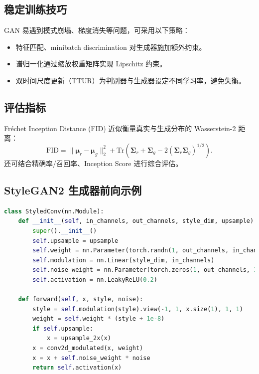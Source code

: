 \documentclass[UTF8,zihao=-4]{ctexart}
\begin{document}
\subsection{稳定训练技巧}
GAN 易遇到模式崩塌、梯度消失等问题，可采用以下策略：
\begin{itemize}
  \item 特征匹配、minibatch discrimination 对生成器施加额外约束。
  \item 谱归一化通过缩放权重矩阵实现 Lipschitz 约束。
  \item 双时间尺度更新（TTUR）为判别器与生成器设定不同学习率，避免失衡。
\end{itemize}

\subsection{评估指标}
Fréchet Inception Distance (FID) 近似衡量真实与生成分布的 Wasserstein-2 距离：
\begin{equation}
  \mathrm{FID} = \|\boldsymbol{\mu}_r - \boldsymbol{\mu}_g\|_2^2 + \mathrm{Tr}\left(\boldsymbol{\Sigma}_r + \boldsymbol{\Sigma}_g - 2(\boldsymbol{\Sigma}_r \boldsymbol{\Sigma}_g)^{1/2}\right).
\end{equation}
还可结合精确率/召回率、Inception Score 进行综合评估。

\subsection{StyleGAN2 生成器前向示例}
\begin{lstlisting}[language=Python, caption={简化版 StyleGAN2 生成块，展示风格调制。}]
class StyledConv(nn.Module):
    def __init__(self, in_channels, out_channels, style_dim, upsample):
        super().__init__()
        self.upsample = upsample
        self.weight = nn.Parameter(torch.randn(1, out_channels, in_channels, 3, 3))
        self.modulation = nn.Linear(style_dim, in_channels)
        self.noise_weight = nn.Parameter(torch.zeros(1, out_channels, 1, 1))
        self.activation = nn.LeakyReLU(0.2)

    def forward(self, x, style, noise):
        style = self.modulation(style).view(-1, 1, x.size(1), 1, 1)
        weight = self.weight * (style + 1e-8)
        if self.upsample:
            x = upsample_2x(x)
        x = conv2d_modulated(x, weight)
        x = x + self.noise_weight * noise
        return self.activation(x)
\end{lstlisting}
\end{document}
